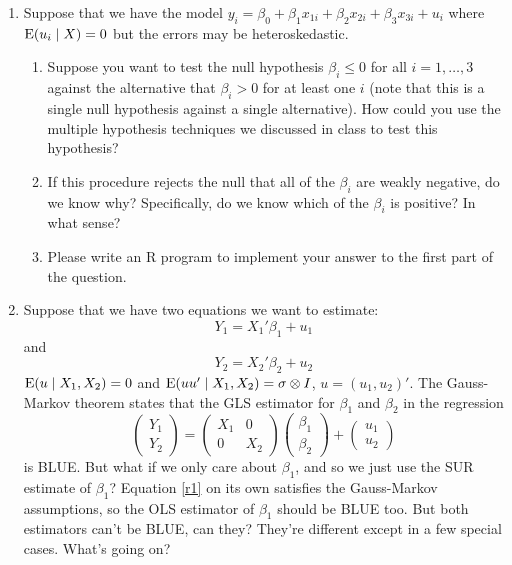 \begin{enumerate}
\item Suppose that we have the model $y_i = \beta_0 + \beta_1 x_{1i} + \beta_2 x_{2i}
  + \beta_3 x_{3i} + u_i$ where $\operatorname{E}(u_i \mid X) = 0$ but the errors may be
  heteroskedastic.

  \begin{enumerate}
  \item Suppose you want to test the null hypothesis $\beta_i \leq 0$ for all
    $i = 1,\dots,3$ against the alternative that $\beta_i > 0$ for at least
    one $i$ (note that this is a single null hypothesis against a
    single alternative).  How could you use the multiple hypothesis
    techniques we discussed in class to test this hypothesis?
  \item If this procedure rejects the null that all of the $\beta_i$ are
    weakly negative, do we know why?  Specifically, do we know which
    of the $\beta_i$ is positive?  In what sense?
  \item Please write an R program to implement your answer to the
    first part of the question.
  \end{enumerate}

\item Suppose that we have two equations we want to estimate:
  \begin{equation}
    \label{r1}
    Y_1 = X_1 '\beta_1 + u_1
  \end{equation}
  and
  \begin{equation}
    \label{r2}
    Y_2 = X_2'\beta_2 + u_2
  \end{equation}
  $\operatorname{E}(u \mid X_1, X_2) = 0$ and $\operatorname{E}(u u' \mid X_1, X_2) = \sigma \otimes I$, $u = (u_1,
  u_2)'$.  The Gauss-Markov theorem states that the GLS estimator for
  $\beta_1$ and $\beta_2$ in the regression
  \begin{equation}
    \label{r3}
    \begin{pmatrix} Y_1 \\ Y_2 \end{pmatrix}
    = \begin{pmatrix} X_1 & 0 \\ 0 & X_2 \end{pmatrix} 
    \begin{pmatrix} \beta_1 \\ \beta_2 \end{pmatrix}
    + \begin{pmatrix} u_1 \\ u_2 \end{pmatrix}
  \end{equation}
  is BLUE.  But what if we only care about $\beta_1$, and so we just use
  the SUR estimate of $\beta_1$?  Equation \eqref{r1} on its own
  satisfies the Gauss-Markov assumptions, so the OLS estimator of $\beta_1$
  should be BLUE too.  But both estimators can't be BLUE, can they?
  They're different except in a few special cases.  What's going on?
\end{enumerate}

